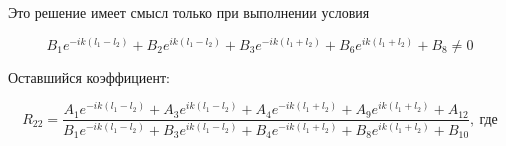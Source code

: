 \documentclass[a4 paper, 12 pt]{extarticle}
\begin{document}
   Это решение имеет смысл только при выполнении условия
   
   \begin{equation}
   \label{cond3}
   {B_1 e^{-ik\left(l_1-l_2\right)} + B_2 e^{ik\left(l_1-l_2\right)} + B_3 e^{-ik\left(l_1+l_2\right)} + B_6 e^{ik\left(l_1+l_2\right)}  + B_8} \neq 0
   \end{equation}
   
   Оставшийся коэффициент:
   
   \begin{equation}
   \label{R22}
   R_{22} = \frac{A_1 e^{-ik\left(l_1-l_2\right)} + A_3 e^{ik\left(l_1-l_2\right)} + A_4 e^{-ik\left(l_1+l_2\right)} + A_9 e^{ik\left(l_1+l_2\right)} + A_{12}}{B_1 e^{-ik\left(l_1-l_2\right)} + B_3 e^{ik\left(l_1-l_2\right)} + B_4 e^{-ik\left(l_1+l_2\right)} + B_8 e^{ik\left(l_1+l_2\right)} + B_{10}},  \ \text{где} 
   \end{equation}
   
\end{document}
